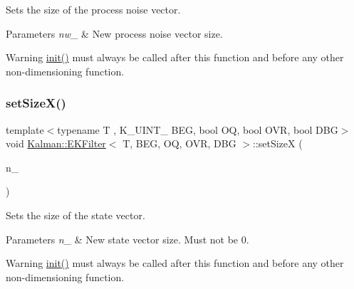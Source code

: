 Sets the size of the process noise vector. 


\begin{DoxyParams}{Parameters}
{\em nw\+\_\+} & New process noise vector size. \\
\hline
\end{DoxyParams}
\begin{DoxyWarning}{Warning}
{\ttfamily \mbox{\hyperlink{classKalman_1_1EKFilter_a80d5dc8f46e8f5d4ec3a6b1e804fdc9f}{init()}}} must always be called after this function and before any other non-\/dimensioning function. 
\end{DoxyWarning}
\mbox{\label{classKalman_1_1EKFilter_a9c56983458ab0d3dca1a855baee71280}} 
\subsubsection{\texorpdfstring{set\+Size\+X()}{setSizeX()}}
{\footnotesize\ttfamily template$<$typename T , K\+\_\+\+U\+I\+N\+T\+\_ B\+EG, bool OQ, bool O\+VR, bool D\+BG$>$ \\
void \mbox{\hyperlink{classKalman_1_1EKFilter}{Kalman\+::\+E\+K\+Filter}}$<$ T, B\+EG, OQ, O\+VR, D\+BG $>$\+::set\+SizeX (\begin{DoxyParamCaption}\item[{\mbox{\hyperlink{namespaceKalman_a628a50cae10f6e2035393d4f96c698bd}{K\+\_\+\+U\+I\+N\+T\+\_\+32}}}]{n\+\_\+ }\end{DoxyParamCaption})}



Sets the size of the state vector. 


\begin{DoxyParams}{Parameters}
{\em n\+\_\+} & New state vector size. Must not be 0. \\
\hline
\end{DoxyParams}
\begin{DoxyWarning}{Warning}
{\ttfamily \mbox{\hyperlink{classKalman_1_1EKFilter_a80d5dc8f46e8f5d4ec3a6b1e804fdc9f}{init()}}} must always be called after this function and before any other non-\/dimensioning function. 
\end{DoxyWarning}
\mbox{\label{classKalman_1_1EKFilter_ae111e647e38f64bed354c85ff8f5c3ad}} 
